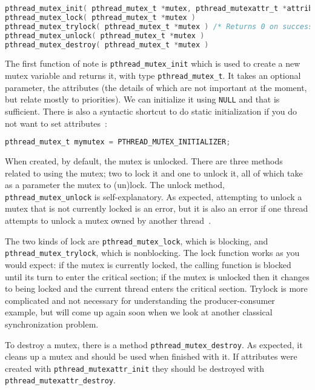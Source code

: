 \begin{lstlisting}[language=C]
pthread_mutex_init( pthread_mutex_t *mutex, pthread_mutexattr_t *attributes )
pthread_mutex_lock( pthread_mutex_t *mutex )
pthread_mutex_trylock( pthread_mutex_t *mutex ) /* Returns 0 on success */
pthread_mutex_unlock( pthread_mutex_t *mutex )
pthread_mutex_destroy( pthread_mutex_t *mutex )
\end{lstlisting}

The first function of note is \texttt{pthread\_mutex\_init} which is used to create a new mutex variable and returns it, with type \texttt{pthread\_mutex\_t}. It takes an optional parameter, the attributes (the details of which are not important at the moment, but relate mostly to priorities). We can initialize it using \texttt{NULL} and that is sufficient. There is also a syntactic shortcut to do static initialization if you do not want to set attributes~\cite{pthreads}:

\begin{lstlisting}[language=C]
pthread_mutex_t mymutex = PTHREAD_MUTEX_INITIALIZER;
\end{lstlisting}

When created, by default, the mutex is unlocked. There are three methods related to using the mutex; two to lock it and one to unlock it, all of which take as a parameter the mutex to (un)lock. The unlock method, \texttt{pthread\_mutex\_unlock} is self-explanatory. As expected, attempting to unlock a mutex that is not currently locked is an error, but it is also an error if one thread attempts to unlock a mutex owned by another thread~\cite{pthreads}.

The two kinds of lock are \texttt{pthread\_mutex\_lock}, which is blocking, and \texttt{pthread\_mutex\_trylock}, which is nonblocking. The lock function works as you would expect: if the mutex is currently locked, the calling function is blocked until its turn to enter the critical section; if the mutex is unlocked then it changes to being locked and the current thread enters the critical section. Trylock is more complicated and not necessary for understanding the producer-consumer example, but will come up again soon when we look at another classical synchronization problem.

To destroy a mutex, there is a method \texttt{pthread\_mutex\_destroy}. As expected, it cleans up a mutex and should be used when finished with it. If attributes were created with \texttt{pthread\_mutexattr\_init} they should be destroyed with \texttt{pthread\_mutexattr\_destroy}.

